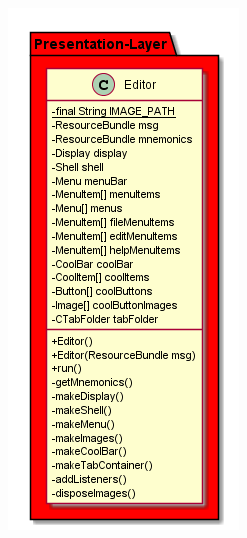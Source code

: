 \begin{figure}[H]
    \centering
    \begin{subfigure}[b]{0.5\linewidth}
        \includegraphics[width=\linewidth]{figures/class/class_diagram_presentation.png}

\end{subfigure}
\end{figure}
